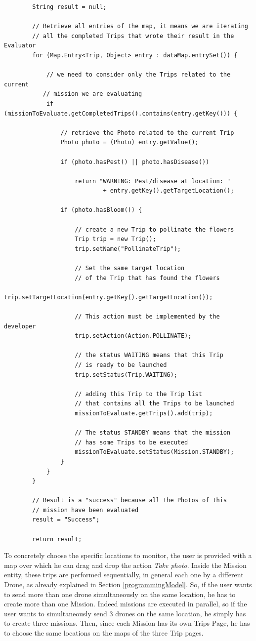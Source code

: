 \begin{lstlisting}
		String result = null;

		// Retrieve all entries of the map, it means we are iterating
        // all the completed Trips that wrote their result in the Evaluator
		for (Map.Entry<Trip, Object> entry : dataMap.entrySet()) {

			// we need to consider only the Trips related to the current
           // mission we are evaluating
			if (missionToEvaluate.getCompletedTrips().contains(entry.getKey())) {
				
				// retrieve the Photo related to the current Trip
				Photo photo = (Photo) entry.getValue();
				
				if (photo.hasPest() || photo.hasDisease())
					
					return "WARNING: Pest/disease at location: "
							+ entry.getKey().getTargetLocation();

				if (photo.hasBloom()) {

					// create a new Trip to pollinate the flowers
					Trip trip = new Trip();
					trip.setName("PollinateTrip");
                    
                    // Set the same target location
                    // of the Trip that has found the flowers
					trip.setTargetLocation(entry.getKey().getTargetLocation());
                    
                    // This action must be implemented by the developer
					trip.setAction(Action.POLLINATE);
                    
                    // the status WAITING means that this Trip
                    // is ready to be launched
					trip.setStatus(Trip.WAITING);

					// adding this Trip to the Trip list
                    // that contains all the Trips to be launched
					missionToEvaluate.getTrips().add(trip);
                    
					// The status STANDBY means that the mission
                    // has some Trips to be executed
					missionToEvaluate.setStatus(Mission.STANDBY);
				}
			}
		}

		// Result is a "success" because all the Photos of this 
        // mission have been evaluated
		result = "Success";
        
		return result;
\end{lstlisting}

To concretely choose the specific locations to monitor, the user is provided with a map over which he can drag and drop the action \textit{Take photo}.
Inside the Mission entity, these trips are performed sequentially, in general each one by a different Drone, as already explained in Section \ref{programmingModel}.
So, if the user wants to send more than one drone simultaneously on the same location, he has to create more than one Mission.
Indeed missions are executed in parallel, so if the user wants to simultaneously send 3 drones on the same location, he simply has to create three missions.
Then,  since each Mission has its own Trips Page, he has to choose the same locations on the maps of the three Trip pages.
\\


